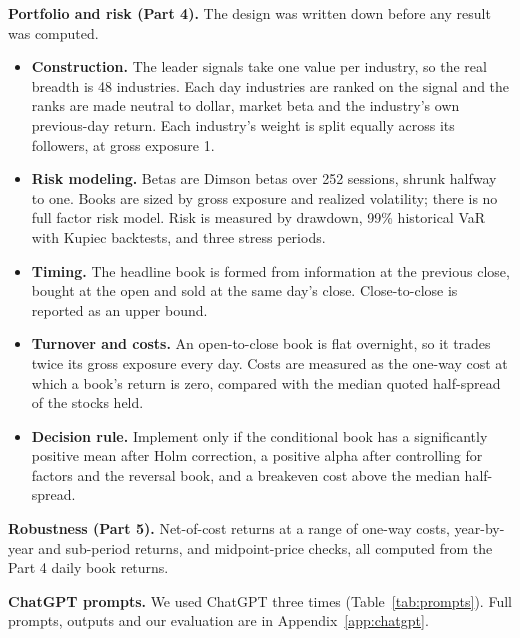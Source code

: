 \documentclass[11pt,letterpaper]{article}
\begin{document}
\textbf{Portfolio and risk (Part 4).} The design was written down before any
result was computed.
\begin{itemize}
\item \textbf{Construction.} The leader signals take one value per industry,
  so the real breadth is 48 industries. Each day industries are ranked on the
  signal and the ranks are made neutral to dollar, market beta and the
  industry's own previous-day return. Each industry's weight is split equally
  across its followers, at gross exposure 1.
\item \textbf{Risk modeling.} Betas are Dimson betas over 252 sessions, shrunk
  halfway to one. Books are sized by gross exposure and realized volatility;
  there is no full factor risk model. Risk is measured by drawdown, 99\%
  historical VaR with Kupiec backtests, and three stress periods.
\item \textbf{Timing.} The headline book is formed from information at the
  previous close, bought at the open and sold at the same day's close.
  Close-to-close is reported as an upper bound.
\item \textbf{Turnover and costs.} An open-to-close book is flat overnight, so
  it trades twice its gross exposure every day. Costs are measured as the
  one-way cost at which a book's return is zero, compared with the median
  quoted half-spread of the stocks held.
\item \textbf{Decision rule.} Implement only if the conditional book has a
  significantly positive mean after Holm correction, a positive alpha after
  controlling for factors and the reversal book, and a breakeven cost above
  the median half-spread.
\end{itemize}

\textbf{Robustness (Part 5).} Net-of-cost returns at a range of one-way costs,
year-by-year and sub-period returns, and midpoint-price checks, all computed
from the Part 4 daily book returns.

\textbf{ChatGPT prompts.} We used ChatGPT three times (Table~\ref{tab:prompts}).
Full prompts, outputs and our evaluation are in Appendix~\ref{app:chatgpt}.
\end{document}
